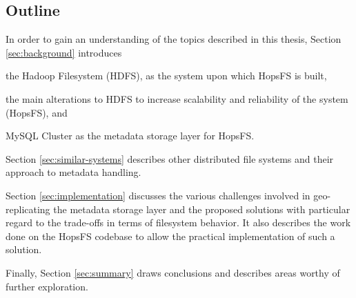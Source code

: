 \subsection{Outline}

In order to gain an understanding of the topics described in this thesis, Section \ref{sec:background} introduces 
\begin{inparaenum}[1)]
\item the Hadoop Filesystem (HDFS), as the system upon which HopsFS is built,
\item the main alterations to HDFS to increase scalability and reliability of the system (HopsFS), and
\item MySQL Cluster as the metadata storage layer for HopsFS.
\end{inparaenum}

Section \ref{sec:similar-systems} describes other distributed file systems and their approach to metadata handling.

Section \ref{sec:implementation} discusses the various challenges involved in geo-replicating the metadata storage layer and the proposed solutions with particular regard to the trade-offs in terms of filesystem behavior.
It also describes the work done on the HopsFS codebase to allow the practical implementation of such a solution.

Finally, Section \ref{sec:summary} draws conclusions and describes areas worthy of further exploration.

